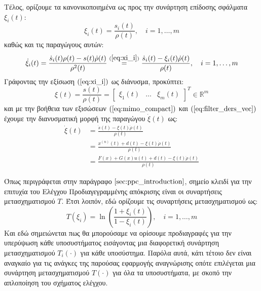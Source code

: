Τέλος, ορίζουμε τα κανονικοποιημένα ως προς την συνάρτηση επίδοσης σφάλματα $\xi_i(t)$:
\begin{equation}
	\xi_i(t) = \frac{s_i(t)}{\rho(t)}, \quad i=1,\dots,m
	\label{eq:xi_i}
\end{equation}
καθώς και τις παραγώγους αυτών:
\begin{equation}
	\dot{\xi}_i(t) =
	\frac{\dot{s}_i(t) \rho(t) - s(t) \dot{\rho}(t)}
	{\rho^2(t)} \stackrel{(\ref{eq:xi_i})}{=}
	\frac{\dot{s}_i(t) - \xi_i(t) \dot{\rho}(t)}{\rho(t)},
	\quad i=1,\dots,m
	\label{eq:xi_i_dot}
\end{equation}
Γράφοντας την εξίσωση $(\ref{eq:xi_i})$ ως διάνυσμα, προκύπτει:
\begin{equation}
	\xi(t) = \frac{s(t)}{\rho(t)} = \begin{bmatrix}\xi_1(t) & \dots & \xi_m(t)\end{bmatrix}^T 
	\in \mathbb{R}^m
\end{equation}
και με την βοήθεια των εξισώσεων $(\ref{eq:mimo_compact})$ και  $(\ref{eq:filter_ders_vec})$ έχουμε την διανυσματική μορφή της παραγώγου $\dot{\xi}(t)$ ως:
\begin{equation}
\begin{split}
\dot{\xi}(t) &= \frac{\dot{s}(t) - \xi(t) \dot{\rho}(t)}{\rho(t)} \\
             &= \frac{x^{(n)}(t) + d(t) - \xi(t) \dot{\rho}(t)}{\rho(t)}\\
             &=\frac{F(x) + G(x)u(t) + d(t) - \xi(t)\dot{\rho}(t)}{\rho(t)}
\end{split}
\label{eq:xi_dot}
\end{equation}

Όπως περιγράφεται στην παράγραφο $\ref{sec:ppc_introduction}$, σημείο κλειδί για την επιτυχία του Ελέγχου Προδιαγεγραμμένης απόκρισης είναι οι συναρτήσεις μετασχηματισμού $T$. Έτσι λοιπόν, εδώ ορίζουμε τις συναρτήσεις μετασχηματισμού ως:
\begin{equation}
	T(\xi_i) = \ln \left( \frac{1 + \xi_i(t)}{1 - \xi_i(t)} \right),
	\quad i=1,\dots,m
\end{equation}
Και εδώ σημειώνεται πως θα μπορούσαμε να ορίσουμε προδιαγραφές για την υπερύψωση κάθε υποσυστήματος εισάγοντας μια διαφορετική συνάρτηση μετασχηματισμού $T_i(\cdot)$ για κάθε υποσύστημα. Παρόλα αυτά, κάτι τέτοιο δεν είναι αναγκαίο για τις ανάγκες της παρούσας εφαρμογής αναγνώρισης οπότε επιλέγεται μια συνάρτηση μετασχηματισμού $T(\cdot)$ για όλα τα υποσυστήματα, με σκοπό την απλοποίηση του σχήματος ελέγχου.

